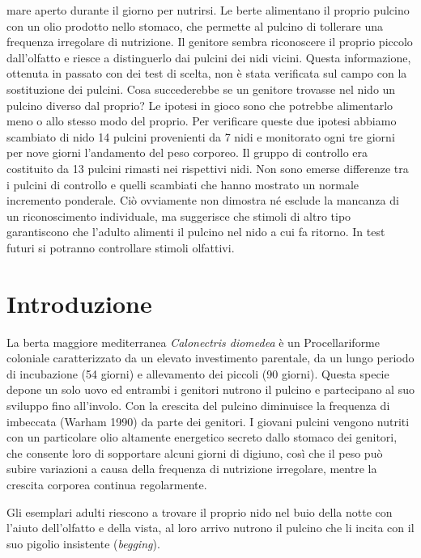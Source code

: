 {mare aperto durante il giorno per nutrirsi. Le berte alimentano il
proprio pulcino con un olio prodotto nello stomaco, che permette al
pulcino di tollerare una frequenza irregolare di nutrizione. Il
genitore sembra riconoscere il proprio piccolo
dall{\textquoteright}olfatto e riesce a distinguerlo dai pulcini dei
nidi vicini. Questa informazione, ottenuta in passato con dei test di
scelta, non \`e stata verificata sul campo con la sostituzione dei
pulcini. Cosa succederebbe se un genitore trovasse nel nido un pulcino
diverso dal proprio? Le ipotesi in gioco sono che potrebbe alimentarlo
meno o allo stesso modo del proprio.
Per verificare queste due ipotesi abbiamo scambiato di nido 14 pulcini
provenienti da 7 nidi e monitorato ogni tre giorni per nove giorni
l{\textquoteright}andamento del peso corporeo.  Il gruppo di controllo
era costituito da 13 pulcini rimasti nei rispettivi nidi. Non sono
emerse differenze tra i pulcini di controllo e quelli scambiati che
hanno mostrato un normale incremento ponderale. Ci\`o ovviamente non
dimostra n\'e esclude la mancanza di un riconoscimento individuale, ma
suggerisce che stimoli di altro tipo garantiscono che
l{\textquoteright}adulto alimenti il pulcino nel nido a cui fa ritorno.
In test futuri si potranno controllare stimoli olfattivi. \\
}


\section*{Introduzione}


La berta maggiore mediterranea \textit{Calonectris diomedea} \`e un
Procellariforme coloniale caratterizzato da un elevato investimento
parentale, da un lungo periodo di incubazione (54 giorni) e allevamento
dei piccoli (90 giorni). Questa specie depone un solo uovo ed entrambi
i genitori nutrono il pulcino e partecipano al suo sviluppo fino
all{\textquoteright}involo. Con la crescita del pulcino diminuisce la
frequenza di imbeccata (Warham 1990) da parte dei genitori. I giovani
pulcini vengono nutriti con un particolare olio altamente energetico
secreto dallo stomaco dei genitori, che consente loro di sopportare
alcuni giorni di digiuno, cos\`i che il peso pu\`o subire variazioni a
causa della frequenza di nutrizione irregolare, mentre la crescita
corporea continua regolarmente.

Gli esemplari adulti riescono a trovare il proprio nido nel buio della
notte con l{\textquoteright}aiuto dell{\textquoteright}olfatto e della
vista, al loro arrivo nutrono il pulcino che li incita con il suo
pigolio insistente (\textit{begging}).

